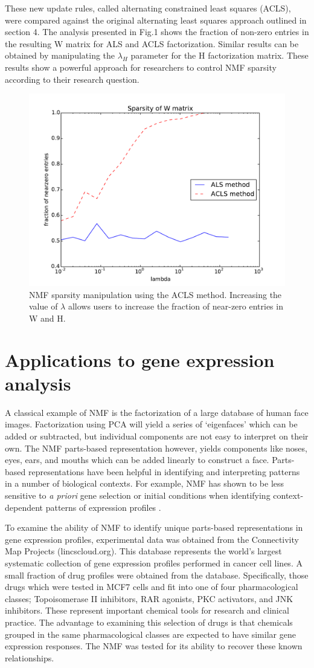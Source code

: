 \documentclass[final,leqno,onefignum,onetabnum]{siamltex1213}
\begin{document}
These new update rules, called alternating constrained least squares (ACLS), were compared against the original alternating least squares approach outlined in section 4. The analysis presented in Fig.1 shows the fraction of non-zero entries in the resulting W matrix for ALS and ACLS factorization. Similar results can be obtained by manipulating the $\lambda_H$ parameter for the H factorization matrix. These results show a powerful approach for researchers to control NMF sparsity according to their research question.
\begin{figure}[t!]
  \centering
    \includegraphics[width=.5\linewidth]{ALS_vs_ACLS_sparsity}
  \caption{NMF sparsity manipulation using the ACLS method. Increasing the value of $\lambda$ allows users to increase the fraction of near-zero entries in W and H.}
\end{figure}

\section{Applications to gene expression analysis}
A classical example of NMF is the factorization of a large database of human face images. Factorization using PCA will yield a series of `eigenfaces' which can be added or subtracted, but individual components are not easy to interpret on their own. The NMF parts-based representation however, yields components like noses, eyes, ears, and mouths which can be added linearly to construct a face. Parts-based representations have been helpful in identifying and interpreting patterns in a number of biological contexts. For example, NMF has shown to be less sensitive to \textit{a priori} gene selection or initial conditions when identifying context-dependent patterns of expression profiles \cite{Bur}.  

To examine the ability of NMF to identify unique parts-based representations in gene expression profiles, experimental data was obtained from the Connectivity Map Projects (lincscloud.org). This database represents the world's largest systematic collection of gene expression profiles performed in cancer cell lines. A small fraction of drug profiles were obtained from the database. Specifically, those drugs which were tested in MCF7 cells and fit into one of four pharmacological classes; Topoisomerase II inhibitors, RAR agonists, PKC activators, and JNK inhibitors. These represent important chemical tools for research and clinical practice. The advantage to examining this selection of drugs is that chemicals grouped in the same pharmacological classes are expected to have similar gene expression responses. The NMF was tested for its ability to recover these known relationships. 
\end{document}
